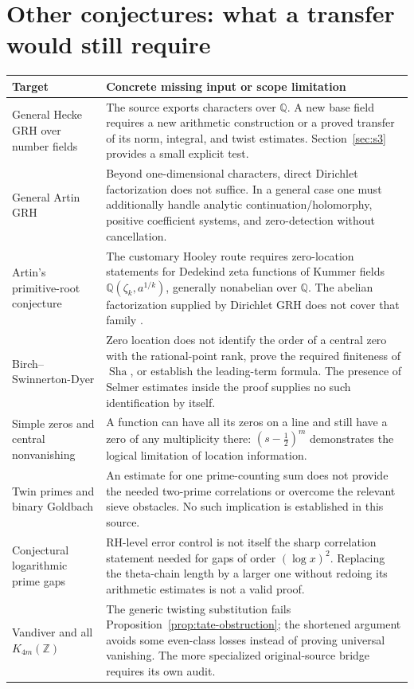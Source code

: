 \documentclass[11pt,letterpaper]{article}
\theoremstyle{definition}
\theoremstyle{remark}
\newcommand{\Q}{\mathbb Q}
\newcommand{\Z}{\mathbb Z}
\newcommand{\Sha}{\operatorname{Sha}}
\begin{document}
\section{Other conjectures: what a transfer would still require}
\label{sec:frontier}

\begin{longtable}{@{}p{}p{}@{}}
\toprule
Target & Concrete missing input or scope limitation\\
\midrule
\endhead
General Hecke GRH over number fields &
The source exports characters over \(\Q\). A new base field
requires a new arithmetic construction or a proved transfer of
its norm, integral, and twist estimates. Section~\ref{sec:s3}
provides a small explicit test.\\[4pt]
General Artin GRH &
Beyond one-dimensional characters, direct Dirichlet factorization
does not suffice. In a general case one must additionally handle
analytic continuation/holomorphy, positive coefficient systems,
and zero-detection without cancellation.\\[4pt]
Artin's primitive-root conjecture &
The customary Hooley route requires zero-location statements for
Dedekind zeta functions of Kummer fields
\(\Q(\zeta_k,a^{1/k})\), generally nonabelian over \(\Q\).
The abelian factorization supplied by Dirichlet GRH does not
cover that family \cite{perucca}.\\[4pt]
Birch--Swinnerton-Dyer &
Zero location does not identify the order of a central zero with
the rational-point rank, prove the required finiteness of
\(\Sha\), or establish the leading-term formula. The presence of
Selmer estimates inside the proof supplies no such identification
by itself.\\[4pt]
Simple zeros and central nonvanishing &
A function can have all its zeros on a line and still have a
zero of any multiplicity there: \((s-\tfrac12)^m\) demonstrates
the logical limitation of location information.\\[4pt]
Twin primes and binary Goldbach &
An estimate for one prime-counting sum does not provide the
needed two-prime correlations or overcome the relevant sieve
obstacles. No such implication is established in this source.\\[4pt]
Conjectural logarithmic prime gaps &
RH-level error control is not itself the sharp correlation
statement needed for gaps of order \((\log x)^2\). Replacing the
theta-chain length by a larger one without redoing its arithmetic
estimates is not a valid proof.\\[4pt]
Vandiver and all \(K_{4m}(\Z)\) &
The generic twisting substitution fails
Proposition~\ref{prop:tate-obstruction}; the shortened argument
avoids some even-class losses instead of proving universal
vanishing. The more specialized original-source bridge requires
its own audit.\\
\bottomrule
\end{longtable}
\end{document}
